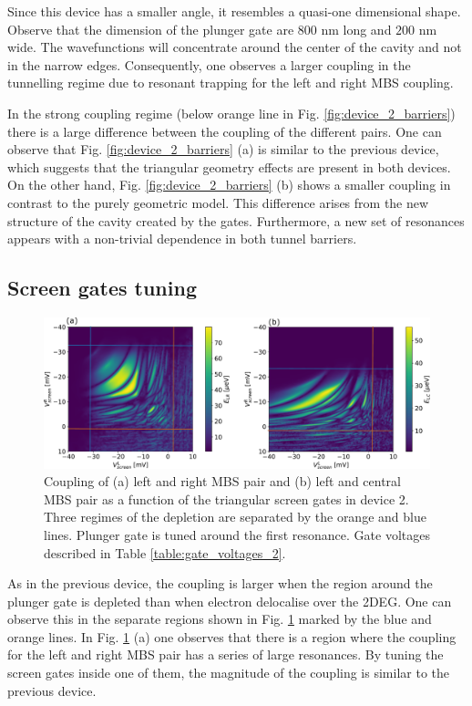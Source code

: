 Since this device has a smaller angle, it resembles a quasi-one dimensional shape.
Observe that the dimension of the plunger gate are $800$ nm long and $200$ nm wide.
The wavefunctions will concentrate around the center of the cavity and not in the narrow edges.
Consequently, one observes a larger coupling in the tunnelling regime due to resonant trapping for the left and right MBS coupling.

In the strong coupling regime (below orange line in Fig. \ref{fig:device_2_barriers}) there is a large difference between the coupling of the different pairs.
One can observe that Fig. \ref{fig:device_2_barriers} (a) is similar to the previous device, which suggests that the triangular geometry effects are present in both devices.
On the other hand, Fig. \ref{fig:device_2_barriers} (b) shows a smaller coupling in contrast to the purely geometric model.
This difference arises from the new structure of the cavity created by the gates.
Furthermore, a new set of resonances appears with a non-trivial dependence in both tunnel barriers.

\subsection{Screen gates tuning}

\begin{figure}[h!]
\centering
  \includegraphics[width=\linewidth]{figures/device_2_screens.pdf}
  \caption{Coupling of (a) left and right MBS pair and (b) left and central MBS pair as a function of the triangular screen gates in device 2. Three regimes of the depletion are separated by the orange and blue lines. Plunger gate is tuned around the first resonance. Gate voltages described in Table \ref{table:gate_voltages_2}.}
  \label{fig:device_2_screens}
\end{figure}

As in the previous device, the coupling is larger when the region around the plunger gate is depleted than when electron delocalise over the 2DEG.
One can observe this in the separate regions shown in Fig. \ref{fig:device_2_screens} marked by the blue and orange lines.
In Fig. \ref{fig:device_2_screens} (a) one observes that there is a region where the coupling for the left and right MBS pair has a series of large resonances.
By tuning the screen gates inside one of them, the magnitude of the coupling is similar to the previous device.

